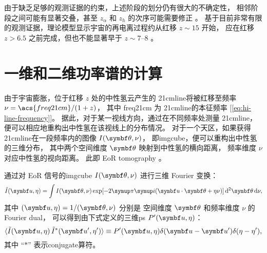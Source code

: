 由于缺乏足够的观测证据的约束，上述阶段的划分仍有很大的不确定性，
相邻阶段之间可能有显著交叠，甚至 $z_{\alpha}$ 和 $z_h$ 的次序可能需要修正
\cite{nusser2005,pritchard2012}。
基于目前非常有限的观测证据，理论模型显示宇宙的再电离过程约从红移 $z \sim 15$ 开始，
应在红移 $z > 6.5$ 之前完成，但也不能显著早于 $z \sim \numrange{7}{8}$
\cite{choudhury2006,pritchard2010mn}。


\section{一维和二维功率谱的计算}
\label{sec:ps}

由于宇宙膨胀，位于红移 $z$ 处的中性氢云产生的 \ac{21cmline}将被红移至频率
$\nu = \acs{freq21cm} / (1 + z)$，
其中 \acs{freq21cm} 为 \ac{21cmline}的本征频率
[\autoref{eq:hi-line-frequency}]。
据此，对于某一视线方向，通过在不同频率处测量 \ac{21cmline}，
便可以相应地重构出中性氢在该视线上的分布情况。
对于一个天区，如果获得 \ac{21cmline}在一段频率内的图像 $I(\B{\theta},\nu)$，
即\ac{imgcube}，便可以重构出中性氢的三维分布，
其中两个空间维度 $\B{\theta}$ 映射到中性氢的横向距离，
频率维度 $\nu$ 对应中性氢的视向距离。
此即 EoR \acf{tomography} \cite{mellema2015}。

通过对 EoR 信号的\ac{imgcube} $I(\B{\theta},\nu)$ 进行三维 Fourier 变换：
\begin{equation}
  \label{eq:ft3d}
  \tilde{I}(\B{u}, \eta) =
    \int I(\B{\theta},\nu) \exp[ -2\Cpi\Ci (\B{u}\cdot\B{\theta} + \eta\nu) ]
    \,\mathrm{d}^2\B{\theta}\,\D{\nu} ,
\end{equation}
其中 $(\B{u}, \eta) = 1 / (\B{\theta}, \nu)$ 分别是
空间维度 $\B{\theta}$ 和频率维度 $\nu$ 的 Fourier \ac{dual}，
可以得到由下式定义的三维\ac{ps} $P'(\B{u}, \eta)$：
\begin{equation}
  \label{eq:ps3d}
  \langle \tilde{I}(\B{u}, \eta) \, \tilde{I}^*(\B{u}', \eta') \rangle
    \equiv P'(\B{u}, \eta) \delta(\B{u}-\B{u}') \delta(\eta-\eta') ,
\end{equation}
其中 \enquote{$*$} 表示\ac{conjugate}算符。

